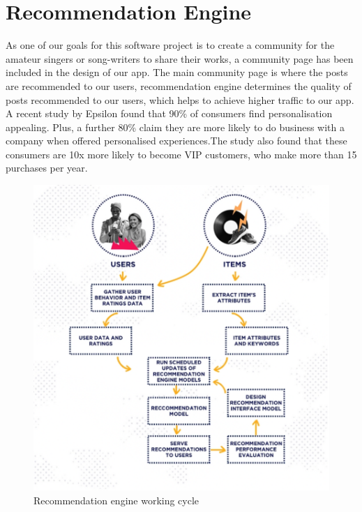 
\chapter{Recommendation Engine}%

\label{Chapter6} %

As one of our goals for this software project is to create a community for the amateur singers or song-writers to share their works, a community page has been included in the design of our app. The main community page is where the posts are recommended to our users, recommendation engine determines the quality of posts recommended to our users, which helps to achieve higher traffic to our app.
\\ A recent study by Epsilon found that 90\% of consumers find personalisation appealing. Plus, a further 80\% claim they are more likely to do business with a company when offered personalised experiences.The study also found that these consumers are 10x more likely to become VIP customers, who make more than 15 purchases per year.


\begin{figure}[ht]
\centering
\includegraphics[scale = 1]{Figures/rsf.png}
\caption{Recommendation engine working cycle}
\end{figure}


